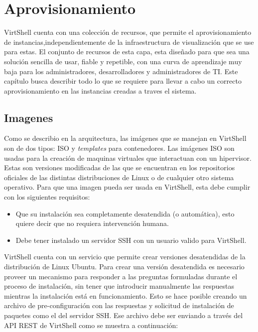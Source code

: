 \chapter{Aprovisionamiento}
\label{capaprovisionamiento}

VirtShell cuenta con una colección de recursos, que permite el aprovisionamiento de instancias,independientemente de la infraestructura de visualización que se use para estas. El conjunto de recursos de esta capa, esta diseñado para que sea una solución sencilla de usar, fiable y repetible, con una curva de aprendizaje muy baja para los administradores, desarrolladores y administradores de TI. Este capítulo busca describir todo lo que se requiere para llevar a cabo un correcto aprovisionamiento en las instancias creadas a traves el sistema.

\section{Imagenes}
Como se describio en la arquitectura, las imágenes que se manejan en VirtShell son de dos tipos: ISO y \emph{templates} para contenedores. Las imágenes ISO son usadas para la creación de maquinas virtuales que interactuan con un hipervisor. Estas son versiones modificadas de las que se encuentran en los repositorios oficiales de las distintas distribuciones de Linux o de cualquier otro sistema operativo. Para que una imagen pueda ser usada en VirtShell, esta debe cumplir con los siguientes requisitos: 
\begin{itemize}
\item Que su instalación sea completamente desatendida (o automática), esto quiere decir que no requiera intervención humana.
\item Debe tener instalado un servidor SSH con un usuario valido para VirtShell.
\end{itemize}

VirtShell cuenta con un servicio que permite crear versiones desatendidas de la distribución de Linux Ubuntu. Para crear una versión desatendida es necesario proveer un mecanismo para responder a las preguntas formuladas durante el proceso de instalación, sin tener que introducir manualmente las respuestas mientras la instalación está en funcionamiento. Esto se hace posible creando un archivo de pre-configuración con las respuestas y solicitud de instalación de paquetes como el del servidor SSH. Ese archivo debe ser enviando a través del API REST de VirtShell como se muestra a continuación:

